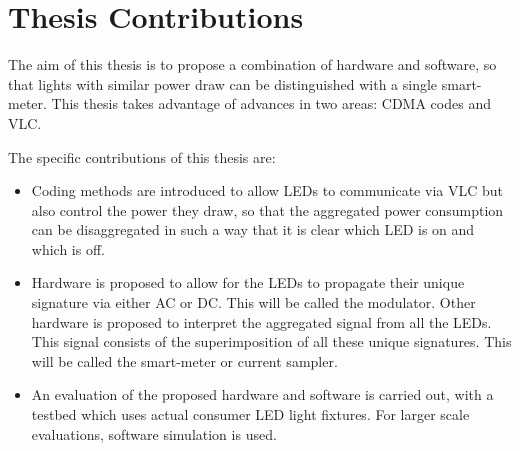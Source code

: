 

\section{Thesis Contributions}

The aim of this thesis is to propose a combination of hardware and software, so that lights with similar power draw can be distinguished with a single smart-meter.
This thesis takes advantage of advances in two areas: CDMA codes and VLC.

The specific contributions of this thesis are:

\begin{itemize}
	\item Coding methods are introduced to allow LEDs to communicate via VLC but also control the power they draw, so that the aggregated power consumption can be disaggregated in such a way that it is clear which LED is on and which is off.

	\item Hardware is proposed to allow for the LEDs to propagate their unique signature via either AC or DC. This will be called the modulator. Other hardware is proposed to interpret the aggregated signal from all the LEDs. This signal consists of the superimposition of all these unique signatures. This will be called the smart-meter or current sampler.

	\item An evaluation of the proposed hardware and software is carried out, with a testbed which uses actual consumer LED light fixtures. For larger scale evaluations, software simulation is used. 
\end{itemize}
